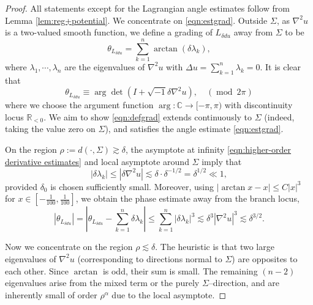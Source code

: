 \documentclass[11pt,a4paper]{article}
\numberwithin{equation}{section}%
\theoremstyle{definition}
\newcommand{\R}{\mathbb{R}}
\newcommand{\C}{\mathbb{C}}
\begin{document}
\begin{proof}
    All statements except for the Lagrangian angle estimates follow from Lemma \ref{lem:reg+potential}. We concentrate on \eqref{eqn:estgrad}. Outside $\Sigma$, as $\nabla^2u$ is a two-valued smooth function, we define a grading of $L_{\delta du}$ away from $\Sigma$ to be
    \begin{equation}
    \label{eqn:defgrad}
        \theta_{L_{\delta du}}=\sum_{k=1}^n\arctan(\delta \lambda_k),
    \end{equation}
where $\lambda_1,\cdots,\lambda_n$ are the eigenvalues of $\nabla^2 u$ with $\Delta u=\sum\limits_{k=1}^n\lambda_k=0$. It is clear that 
    \begin{equation}
        \label{eqn:anglemod2pi}
        \theta_{L_{\delta du}}\equiv \arg \det (I+\sqrt{-1}\delta \nabla^2u),\quad (\operatorname{mod}~2\pi)
    \end{equation}
where we choose the argument function $\arg:\C\to [-\pi,\pi)$ with discontinuity locus $\R_{<0}$. We aim to show \eqref{eqn:defgrad} extends continuously to $\Sigma$ (indeed, taking the value zero on $\Sigma$), and satisfies the angle estimate \eqref{eqn:estgrad}. 

On the region $\rho:=d(\cdot,\Sigma)\gtrsim \delta$, the asymptote at infinity \eqref{eqn:higher-order derivative estimates} and local asymptote around $\Sigma$ imply that 
$$|\delta \lambda_k|\leqslant |\delta \nabla^2 u|\lesssim \delta\cdot \delta^{-1/2}=\delta ^{1/2} \ll 1,$$ provided $\delta_0$ is chosen sufficiently small. Moreover, using  $\left|\operatorname{arctan}x-x\right|\leqslant C|x|^3$ for $x\in [-\frac{1}{100},\frac{1}{100}]$, we obtain the phase estimate away from the branch locus,
$$|\theta_{L_{\delta du}}|=\left|\theta_{L_{\delta du}}-\sum_{k=1}^n \delta \lambda_k\right|\leqslant \sum_{k=1}^n|\delta \lambda_k|^3\lesssim \delta^3|\nabla^2 u|^3\lesssim \delta^{3/2}.$$

Now we concentrate on the region $\rho \lesssim \delta$. The heuristic is that two large eigenvalues of $\nabla^2u$ (corresponding to directions normal to $\Sigma$) are opposites to each other. Since $\arctan$ is odd, their sum is small. The remaining $(n-2)$ eigenvalues arise from the mixed term or the purely $\Sigma$--direction, and are inherently small of order $\rho^\alpha$ due to the local asymptote. 


\end{proof}
\end{document}
